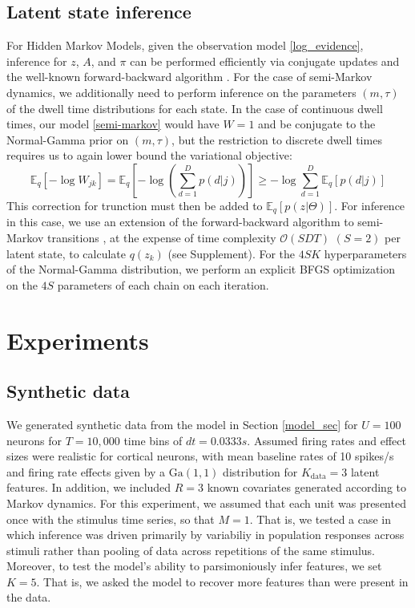 \documentclass{article} %
\begin{document}
\subsection{Latent state inference}
For Hidden Markov Models, given the observation model \ref{log_evidence}, inference for $z$, $A$, and $\pi$ can be performed efficiently via conjugate updates and the well-known forward-backward algorithm \cite{beal2003variational}. For the case of semi-Markov dynamics, we additionally need to perform inference on the parameters $(m, \tau)$ of the dwell time distributions for each state. In the case of continuous dwell times, our model \ref{semi-markov} would have $W = 1$ and be conjugate to the Normal-Gamma prior on $(m, \tau)$, but the restriction to discrete dwell times requires us to again lower bound the variational objective:
\begin{equation}
    \mathbb{E}_q\left[-\log W_{jk} \right] = 
    \mathbb{E}_q\left[- \log \left( \sum_{d=1}^D p(d|j)\right) \right]
    \ge -\log \sum_{d = 1}^D \mathbb{E}_q\left[p(d|j)\right]
\end{equation}
This correction for trunction must then be added to $\mathbb{E}_q[p(z|\Theta)]$. For inference in this case, we use an extension of the forward-backward algorithm to semi-Markov transitions \cite{Yu2006-bb}, at the expense of time complexity $\mathcal{O}(SDT)$ $(S = 2)$ per latent state, to calculate $q(z_k)$ (see Supplement). For the $4SK$ hyperparameters of the Normal-Gamma distribution, we perform an explicit BFGS optimization on the $4S$ parameters of each chain on each iteration.

\section{Experiments}
\subsection{Synthetic data}
We generated synthetic data from the model in Section \ref{model_sec} for $U=100$ neurons for $T=10,000$ time bins of $dt=0.0333s$. Assumed firing rates and effect sizes were realistic for cortical neurons, with mean baseline rates of 10 spikes/s and firing rate effects given by a $\text{Ga}(1, 1)$ distribution for $K_{\text{data}}=3$ latent features. In addition, we included $R=3$ known covariates generated according to Markov dynamics. For this experiment, we assumed that each unit was presented once with the stimulus time series, so that $M = 1$. That is, we tested a case in which inference was driven primarily by variabiliy in population responses across stimuli rather than pooling of data across repetitions of the same stimulus. Moreover, to test the model's ability to parsimoniously infer features, we set $K=5$. That is, we asked the model to recover more features than were present in the data.
\end{document}
